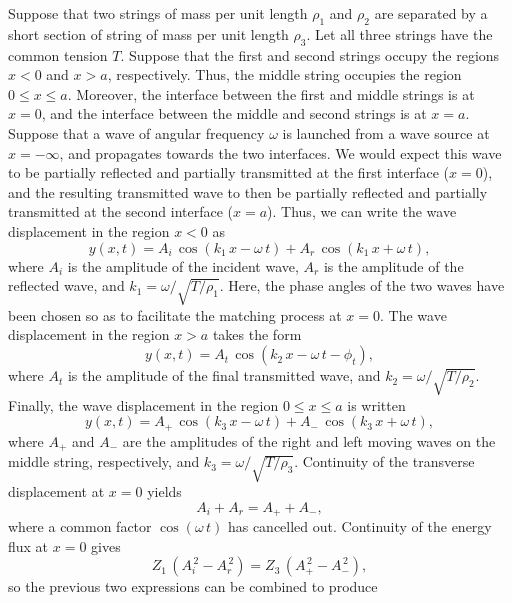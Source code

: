Suppose that two strings of mass per unit length $\rho_1$ and $\rho_2$ are
separated by a short section of string of mass per unit length $\rho_3$. Let all
three strings have the common tension $T$. Suppose that the first and second strings occupy
the regions $x<0$ and $x>a$, respectively. Thus, the middle string occupies the
region $0\leq x\leq a$. Moreover, the interface between the first  and middle
strings is at $x=0$, and  the interface between the middle and 
second strings is at $x=a$. Suppose  that a  wave of angular frequency $\omega$ is launched
from a wave source at $x=-\infty$, and propagates towards the two interfaces. We
would expect this wave to be partially reflected and partially transmitted at the first
interface ($x=0$), and the resulting transmitted wave to then be partially
reflected and partially transmitted at the second interface ($x=a$). Thus, we can write the
wave displacement in the region $x<0$ as
\begin{equation}
y(x,t) = A_i\,\cos(k_1\,x-\omega\,t) + A_r\,\cos(k_1\,x+\omega\,t),
\end{equation}
where $A_i$ is the amplitude of the incident wave, $A_r$ is the amplitude
of the reflected wave, and $k_1=\omega/\sqrt{T/\rho_1}$. 
Here, the phase angles of the two waves have been chosen so as to
facilitate the matching process at $x=0$. 
The wave displacement in the region $x>a$ takes the form
\begin{equation}
y(x,t) = A_t\,\cos(k_2\,x-\omega\,t-\phi_t),
\end{equation}
where $A_t$ is the amplitude of the final transmitted wave, and $k_2=\omega/\sqrt{T/\rho_2}$. Finally, the wave displacement in the region $0\leq x\leq a$ is written
\begin{equation}
y(x,t) = A_+\,\cos(k_3\,x-\omega\,t) + A_-\,\cos(k_3\,x+\omega\,t),
\end{equation}
where $A_+$ and $A_-$ are the amplitudes of the right and left moving waves on the
middle string, respectively, and $k_3=\omega/\sqrt{T/\rho_3}$. Continuity of the
transverse displacement at $x=0$ yields
\begin{equation}\label{e7.79}
A_i + A_r=A_+ + A_-,
\end{equation}
where a common factor $\cos(\omega\,t)$ has cancelled out.
Continuity of the energy flux at $x=0$ gives
\begin{equation}
Z_1\,(A_i^{\,2}-A_r^{\,2}) = Z_3\,(A_+^{\,2}-A_-^{\,2}),
\end{equation}
so the previous two expressions can be combined to produce

